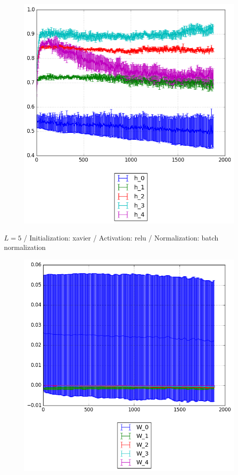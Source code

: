 \documentclass{beamer}
\begin{document}
{\begin{frame}[t]{}{}
\begin{figure}
    			\includegraphics[scale=0.4]{gfx/l5b32_relu_xavier_batch_normalization_cnn_activations}
    		\end{figure}
    		\vfill
	\end{frame}
	\begin{frame}[t]{}{}%
		\vfill
		\begin{center}
			{$L = 5$ / Initialization: xavier / Activation: relu / Normalization: batch normalization}
		\end{center}
    		\begin{figure}
    			\centering
    			\includegraphics[scale=0.4]{gfx/l5b32_relu_xavier_batch_normalization_cnn_weights}
    		\end{figure}
    		\vfill
	\end{frame}
}	
\end{document}
